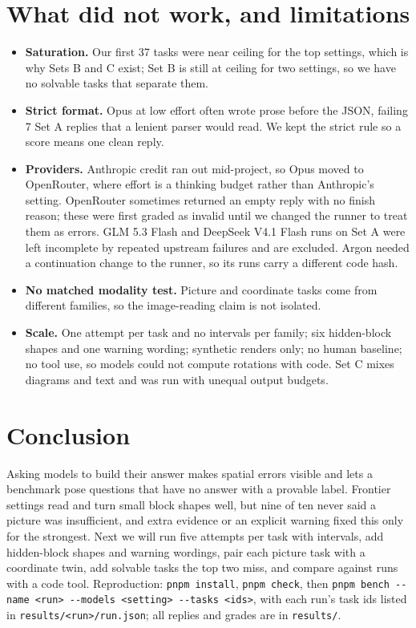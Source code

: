 \documentclass[10pt,twocolumn,letterpaper]{article}
\begin{document}
\section{What did not work, and limitations}
\begin{itemize}
\item \textbf{Saturation.} Our first 37 tasks were near ceiling for the top settings, which is why Sets B and C exist; Set B is still at ceiling for two settings, so we have no solvable tasks that separate them.
\item \textbf{Strict format.} Opus at low effort often wrote prose before the JSON, failing 7 Set A replies that a lenient parser would read. We kept the strict rule so a score means one clean reply.
\item \textbf{Providers.} Anthropic credit ran out mid-project, so Opus moved to OpenRouter, where effort is a thinking budget rather than Anthropic's setting. OpenRouter sometimes returned an empty reply with no finish reason; these were first graded as invalid until we changed the runner to treat them as errors. GLM 5.3 Flash and DeepSeek V4.1 Flash runs on Set A were left incomplete by repeated upstream failures and are excluded. Argon needed a continuation change to the runner, so its runs carry a different code hash.
\item \textbf{No matched modality test.} Picture and coordinate tasks come from different families, so the image-reading claim is not isolated.
\item \textbf{Scale.} One attempt per task and no intervals per family; six hidden-block shapes and one warning wording; synthetic renders only; no human baseline; no tool use, so models could not compute rotations with code. Set C mixes diagrams and text and was run with unequal output budgets.
\end{itemize}

\section{Conclusion}
Asking models to build their answer makes spatial errors visible and lets a benchmark pose questions that have no answer with a provable label. Frontier settings read and turn small block shapes well, but nine of ten never said a picture was insufficient, and extra evidence or an explicit warning fixed this only for the strongest. Next we will run five attempts per task with intervals, add hidden-block shapes and warning wordings, pair each picture task with a coordinate twin, add solvable tasks the top two miss, and compare against runs with a code tool. Reproduction: \texttt{pnpm install}, \texttt{pnpm check}, then \texttt{pnpm bench -{}-name <run> -{}-models <setting> -{}-tasks <ids>}, with each run's task ids listed in \texttt{results/<run>/run.json}; all replies and grades are in \texttt{results/}.
\end{document}
